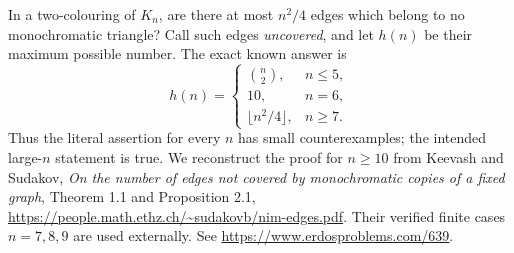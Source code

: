 In a two-colouring of \(K_n\), are there at most \(n^2/4\) edges
which belong to no monochromatic triangle?
Call such edges \emph{uncovered}, and let \(h(n)\) be their maximum
possible number. The exact known answer is
\[
 h(n)=
 \begin{cases}
 \binom n2,&n\leq5,\\
 10,&n=6,\\
 \lfloor n^2/4\rfloor,&n\geq7.
 \end{cases}
\]
Thus the literal assertion for every \(n\) has small counterexamples;
the intended large-\(n\) statement is true.
We reconstruct the proof for \(n\geq10\) from Keevash and Sudakov,
\emph{On the number of edges not covered by monochromatic copies of
a fixed graph}, Theorem 1.1 and Proposition 2.1,
\url{https://people.math.ethz.ch/~sudakovb/nim-edges.pdf}.
Their verified finite cases \(n=7,8,9\) are used externally.
See \url{https://www.erdosproblems.com/639}.
